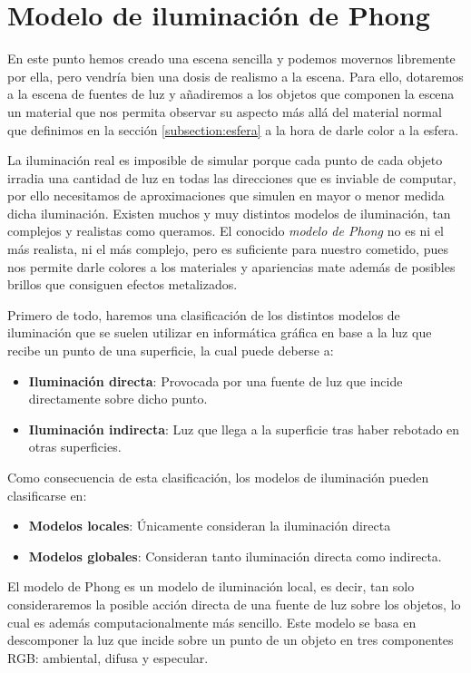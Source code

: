 \section{Modelo de iluminación de Phong}
\label{section:Phong}
En este punto hemos creado una escena sencilla y podemos movernos libremente por ella, pero vendría bien una dosis de realismo a la escena. Para ello, dotaremos a la escena de fuentes de luz y añadiremos a los objetos que componen la escena un material que nos permita observar su aspecto más allá del material normal que definimos en la sección \ref{subsection:esfera} a la hora de darle color a la esfera.

La iluminación real es imposible de simular porque cada punto de cada objeto irradia una cantidad de luz en todas las direcciones que es inviable de computar, por ello necesitamos de aproximaciones que simulen en mayor o menor medida dicha iluminación. Existen muchos y muy distintos modelos de iluminación, tan complejos y realistas como queramos. El conocido \textit{modelo de Phong} no es ni el más realista, ni el más complejo, pero es suficiente para nuestro cometido, pues nos permite darle colores a los materiales y apariencias mate además de posibles brillos que consiguen efectos metalizados.

Primero de todo, haremos una clasificación de los distintos modelos de iluminación que se suelen utilizar en informática gráfica en base a la luz que recibe un punto de una superficie, la cual puede deberse a:
\begin{itemize}
    \item \textbf{Iluminación directa}: Provocada por una fuente de luz que incide directamente sobre dicho punto.
    \item \textbf{Iluminación indirecta}: Luz que llega a la superficie tras haber rebotado en otras superficies.
\end{itemize}
Como consecuencia de esta clasificación, los modelos de iluminación pueden clasificarse en:
\begin{itemize}
    \item \textbf{Modelos locales}: Únicamente consideran la iluminación directa
    \item \textbf{Modelos globales}: Consideran tanto iluminación directa como indirecta.
\end{itemize}
El modelo de Phong es un modelo de iluminación local, es decir, tan solo consideraremos la posible acción directa de una fuente de luz sobre los objetos, lo cual es además computacionalmente más sencillo. Este modelo se basa en descomponer la luz que incide sobre un punto de un objeto en tres componentes RGB: ambiental, difusa y especular.

